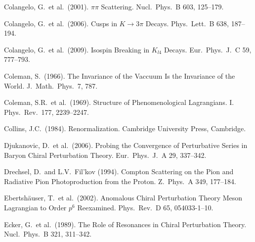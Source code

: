 \documentclass[twoside,12pt]{article}
\begin{document}
\begin{thebibliography}{}
Colangelo, G.~et al.~(2001).
$\pi\pi$ Scattering.
Nucl.\ Phys.\  B 603, 125--179.

Colangelo, G.~et al.~(2006).
Cusps in $K\to 3\pi$ Decays.
Phys.\ Lett.\  B 638, 187--194.

Colangelo, G.~et al.~(2009).
Isospin Breaking in $K_{l4}$ Decays.
Eur.\ Phys.\ J.\  C 59, 777--793.

Coleman, S.~(1966).
The Invariance of the Vaccuum Is the Invariance of the World.
J.~Math.~Phys.~7, 787.

Coleman, S.R.~et al.~(1969).
Structure of Phenomenological Lagrangians. I.
Phys.\ Rev.\  177, 2239--2247.

Collins, J.C.~(1984). Renormalization. Cambridge University Press,
Cambridge.

Djukanovic, D.~et al.~(2006).
Probing the Convergence of Perturbative Series in Baryon Chiral Perturbation Theory.
Eur.\ Phys.\ J.\  A 29, 337--342.

Drechsel, D.~and L.V.~Fil'kov (1994).
Compton Scattering on the Pion and Radiative Pion Photoproduction
from the Proton.
Z.\ Phys.\  A 349, 177--184.

Ebertsh{\"a}user, T.~et al.~(2002).
Anomalous Chiral Perturbation Theory Meson Lagrangian to Order $p^6$
Reexamined.
Phys.\ Rev.\  D 65, 054033-1--10.

Ecker, G.~et al.~(1989).
The Role of Resonances in Chiral Perturbation Theory.
Nucl.\ Phys.\  B 321, 311--342.


\end{thebibliography}
\end{document}
